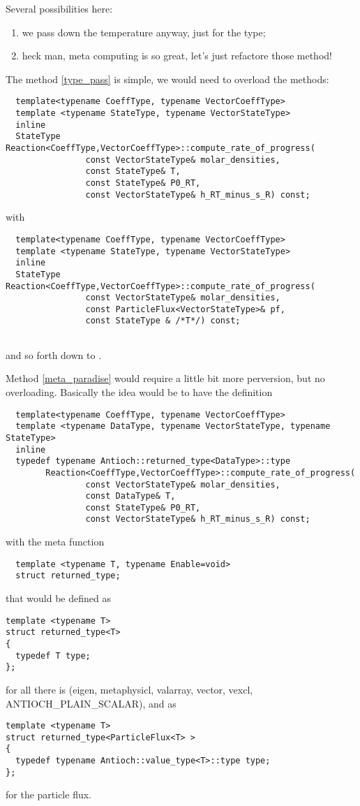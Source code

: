 Several possibilities here:
\begin{enumerate}
\item\label{type_pass} we pass down the temperature anyway, just for the type;
\item\label{meta_paradise} heck man, meta computing is so great, let's just refactore those method!
\end{enumerate}

The method \ref{type_pass} is simple, we would need to overload the methods:
\begin{verbatim}
  template<typename CoeffType, typename VectorCoeffType>
  template <typename StateType, typename VectorStateType>
  inline
  StateType Reaction<CoeffType,VectorCoeffType>::compute_rate_of_progress( 
                const VectorStateType& molar_densities,
                const StateType& T,  
                const StateType& P0_RT,  
                const VectorStateType& h_RT_minus_s_R) const;
\end{verbatim}
with
\begin{verbatim}
  template<typename CoeffType, typename VectorCoeffType>
  template <typename StateType, typename VectorStateType>
  inline
  StateType Reaction<CoeffType,VectorCoeffType>::compute_rate_of_progress( 
                const VectorStateType& molar_densities,
                const ParticleFlux<VectorStateType>& pf,
                const StateType & /*T*/) const;
                
\end{verbatim}
and so forth down to \KineticsType.

Method \ref{meta_paradise} would require a little bit more perversion, but no
overloading. Basically the idea would be to have the definition
\begin{verbatim}
  template<typename CoeffType, typename VectorCoeffType>
  template <typename DataType, typename VectorStateType, typename StateType>
  inline
  typedef typename Antioch::returned_type<DataType>::type
        Reaction<CoeffType,VectorCoeffType>::compute_rate_of_progress( 
                const VectorStateType& molar_densities,
                const DataType& T,  
                const StateType& P0_RT,  
                const VectorStateType& h_RT_minus_s_R) const;
\end{verbatim}
with the meta function
\begin{verbatim}
  template <typename T, typename Enable=void>
  struct returned_type;
\end{verbatim}
that would be defined as
\begin{verbatim}
template <typename T>
struct returned_type<T>
{
  typedef T type;
};
\end{verbatim}
for all there is (eigen, metaphysicl, valarray, vector, vexcl, ANTIOCH\_PLAIN\_SCALAR), and
as
\begin{verbatim}
template <typename T>
struct returned_type<ParticleFlux<T> >
{
  typedef typename Antioch::value_type<T>::type type;
};
\end{verbatim}
for the particle flux.
